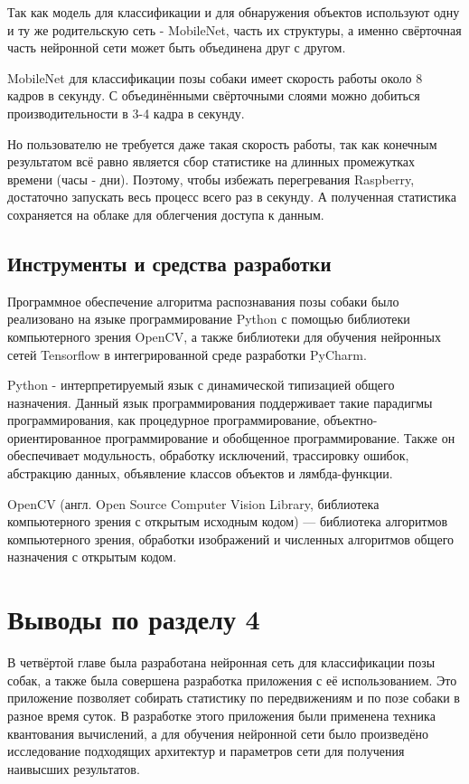 Так как модель для классификации и для обнаружения объектов используют одну и ту же родительскую сеть - MobileNet, часть их структуры, а именно свёрточная часть нейронной сети может быть объединена друг с другом. 

MobileNet для классификации позы собаки имеет скорость работы около 8 кадров в секунду. С объединёнными свёрточными слоями можно добиться производительности в 3-4 кадра в секунду.

Но пользователю не требуется даже такая скорость работы, так как конечным результатом всё равно является сбор статистике на длинных промежутках времени (часы - дни). Поэтому, чтобы избежать перегревания Raspberry, достаточно запускать весь процесс всего раз в секунду. А полученная статистика сохраняется на облаке для облегчения доступа к данным.

\subsection{Инструменты и средства разработки}\label{ide}
Программное обеспечение алгоритма распознавания позы собаки было реализовано на языке программирование Python с помощью библиотеки компьютерного зрения OpenCV, а также библиотеки для обучения нейронных сетей Tensorflow в интегрированной среде разработки PyCharm.

Python - интерпретируемый язык с динамической типизацией общего назначения. Данный язык программирования поддерживает такие парадигмы программирования, как процедурное программирование, объектно-ориентированное программирование и обобщенное программирование. Также он обеспечивает модульность, обработку исключений, трассировку ошибок, абстракцию данных, объявление классов объектов и лямбда-функции.

OpenCV (англ. Open Source Computer Vision Library, библиотека компьютерного зрения с открытым исходным кодом) — библиотека алгоритмов компьютерного зрения, обработки изображений и численных алгоритмов общего назначения с открытым кодом.

\section*{Выводы по разделу 4}\label{outro_part_4}
В четвёртой главе была разработана нейронная сеть для классификации позы собак, а также была совершена разработка приложения с её использованием. Это приложение позволяет собирать статистику по передвижениям и по позе собаки в разное время суток. В разработке этого приложения были применена техника квантования вычислений, а для обучения нейронной сети было произведёно исследование подходящих архитектур и параметров сети для получения наивысших результатов.